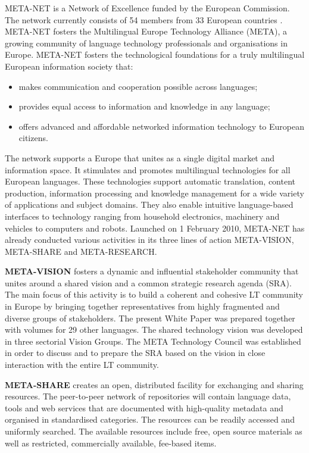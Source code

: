 \begin{multicols}{2}
META-NET is a Network of Excellence funded by the European Commission. The network currently consists of 54 members from 33 European countries \cite{rehm2011}. META-NET fosters the Multilingual Europe Technology Alliance (META), a growing community of language technology professionals and organisations in Europe. META-NET fosters the technological foundations for a truly multilingual European information society that:

\begin{itemize}
\item makes communication and cooperation possible across languages;
\item provides equal access to information and knowledge in any language;
\item offers advanced and affordable networked information technology to European citizens.
\end{itemize}

The network supports a Europe that unites as a single digital market and information space. It stimulates and promotes multilingual technologies for all European languages. These technologies support automatic translation, content production, information processing and knowledge management for a wide variety of applications and subject domains. They also enable intuitive language-based interfaces to technology ranging from household electronics, machinery and vehicles to computers and robots.
%
Launched on 1 February 2010, META-NET has already conducted various activities in its three lines of action META-VISION, META-SHARE and META-RESEARCH.

\textbf{META-VISION} fosters a dynamic and influential stakeholder community that unites around a shared vision and a common strategic research agenda (SRA). The main focus of this activity is to build a coherent and cohesive LT community in Europe by bringing together representatives from highly fragmented and diverse groups of stakeholders. The present White Paper was prepared together with volumes for 29 other languages. The shared technology vision was developed in three sectorial Vision Groups. The META Technology Council was established in order to discuss and to prepare the SRA based on the vision in close interaction with the entire LT community. 

\textbf{META-SHARE} creates an open, distributed facility for exchanging and sharing resources. The peer-to-peer network of repositories will contain language data, tools and web services that are documented with high-quality metadata and organised in standardised categories. The resources can be readily accessed and uniformly searched. The available resources include free, open source materials as well as restricted, commercially available, fee-based items.


\end{multicols}
